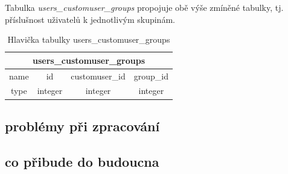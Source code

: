 Tabulka \textit{users\_customuser\_groups} propojuje obě výše zmíněné tabulky, tj. příslušnost uživatelů k jednotlivým skupinám.

\begin{table}[H]
\centering
\begin{tabular}{@{}|c|c|c|c|@{}}
\toprule
\multicolumn{4}{|c|}{users\_customuser\_groups} \\ \midrule
name & id & customuser\_id & group\_id \\ \midrule
type & integer & integer & integer \\ \bottomrule
\end{tabular}
\caption{Hlavička tabulky users\_customuser\_groups}
\label{tab:users-customuser-groups}
\end{table}

\subsection{problémy při zpracování}

\subsection{co přibude do budoucna}
\label{python-knihovna}


